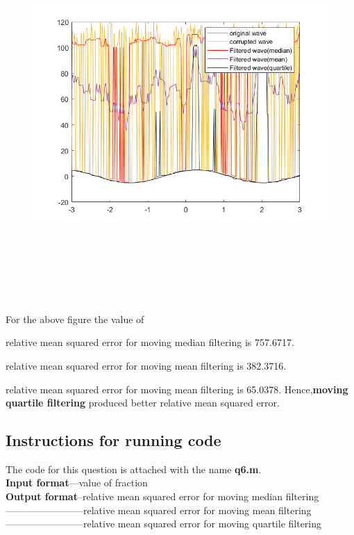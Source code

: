 \documentclass{article}
\begin{document}
\begin{figure}[H]
    {\includegraphics[width =19cm, height=14cm]{60per.png}}
\end{figure}
    For the above figure the value of \\
    \par 
    relative mean squared error for moving median filtering is 757.6717.
    \par 
    relative mean squared error for moving mean filtering is 382.3716.
    \par 
    relative mean squared error for moving mean filtering is 65.0378.
    \newline
    Hence,\textbf{moving quartile filtering} produced better relative mean squared error.\\
\subsection*{Instructions for running code}
    The code for this question is attached with the name \textbf{q6.m}.\\
    \textbf{Input format}---value of fraction\\
    \textbf{Output format}--relative mean squared error for moving median filtering\\
    ------------------------relative mean squared error for moving mean filtering\\
    ------------------------relative mean squared error for moving quartile filtering
\newpage
\end{document}
